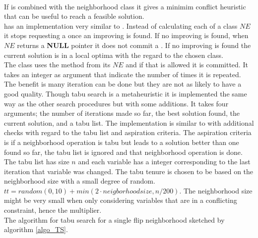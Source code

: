 \DecMargin{1em} \\
If  is combined with the neighborhood class  it gives a minimim 
conflict heuristic that can be useful to reach a feasible solution. \\ 
 has an implementation very similar to . Instead of calculating each 
 of a  class $NE$ it stops requesting a  once an improving  is 
found. If no improving  is found, when $NE$ returns a \textbf{NULL} pointer it does not commit a 
. If no improving  is found the current solution is in a local optima with the regard to the 
chosen  class. \\ 
The class  uses the method  from its  $NE$ and if that 
 is allowed it is committed. It takes an integer as argument that indicate the number of times it is 
repeated. The benefit is many iteration can be done but they are not as likely to have a good quality.  
Though tabu search is a metaheuristic it is implemented the same way as the other search procedures but with some 
additions. It takes four arguments; the number of iterations made so far, the best solution found, the current 
solution, and a tabu list. The implementation is similar to  with additional checks with regard 
to the tabu list and aspiration criteria. The aspiration criteria is if a neighborhood operation is tabu but leads to a 
solution better than one found so far, the tabu list is ignored and that neighborhood operation is done. The 
tabu list has size $n$ and each variable has a integer corresponding to the last iteration that variable was 
changed. The tabu tenure is chosen to be based on the neighborhood size with a small degree of random. $tt = 
random(0,10) + min(2\cdot neigborhood size, n/200)$. The neighborhood size might be very small when only considering 
variables that are in a conflicting constraint, hence the multiplier. \\ 
The algorithm for tabu search for a single flip neighborhood sketched by algorithm \ref{algo_TS}. \\ 
\IncMargin{1em}
